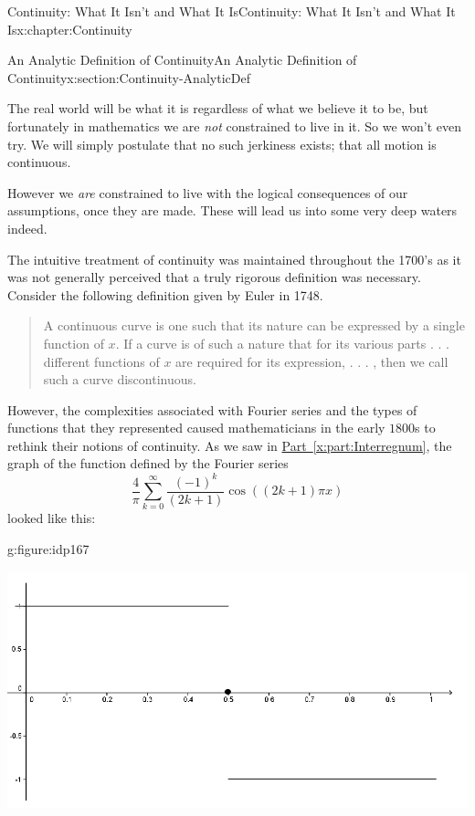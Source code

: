 \begin{chapterptx}{Continuity: What It Isn't and What It Is}{}{Continuity: What It Isn't and What It Is}{}{}{x:chapter:Continuity}
\begin{sectionptx}{An Analytic Definition of Continuity}{}{An Analytic Definition of Continuity}{}{}{x:section:Continuity-AnalyticDef}
		\par
		The real world will be what it is regardless of what we believe it to be, but fortunately in mathematics we are \emph{not} constrained to live in it.  So we won't even try.  We will simply postulate that no such jerkiness exists; that all motion is continuous.%
		\par
		However we \emph{are} constrained to live with the logical consequences of our assumptions, once they are made.  These will lead us into some very deep waters indeed.%
		\par
		The intuitive treatment of continuity was maintained throughout the 1700's as it was not generally perceived that a truly rigorous definition was necessary.  Consider the following definition given by Euler in 1748.%
		\begin{quote}%
			A continuous curve is one such that its nature can be expressed by a single function of \(x.\) If a curve is of such a nature that for its various parts . . . different functions of \(x\) are required for its expression, . . . , then we call such a curve discontinuous.%
		\end{quote}
		However, the complexities associated with Fourier series and the types of functions that they represented caused mathematicians in the early \(1800\)s to rethink their notions of continuity.  As we saw in \hyperref[x:part:Interregnum]{Part~{\xreffont\ref{x:part:Interregnum}}}, the graph of the function defined by the Fourier series%
		\begin{equation*}
			\frac{4}{\pi}\sum_{k=0}^\infty\frac{\left(-1\right)^k}{\left(2k+1\right)} \cos \left(\left(2k+1\right)\pi x\right)
		\end{equation*}
		looked like this:%
		\begin{figureptx}{}{g:figure:idp167}{}%
			\begin{image}{0.125}{0.75}{0.125}%
				\includegraphics[width=\linewidth]{external/images/Ch5fig1.png}

\end{image}
\end{figureptx}
\end{sectionptx}
\end{chapterptx}
